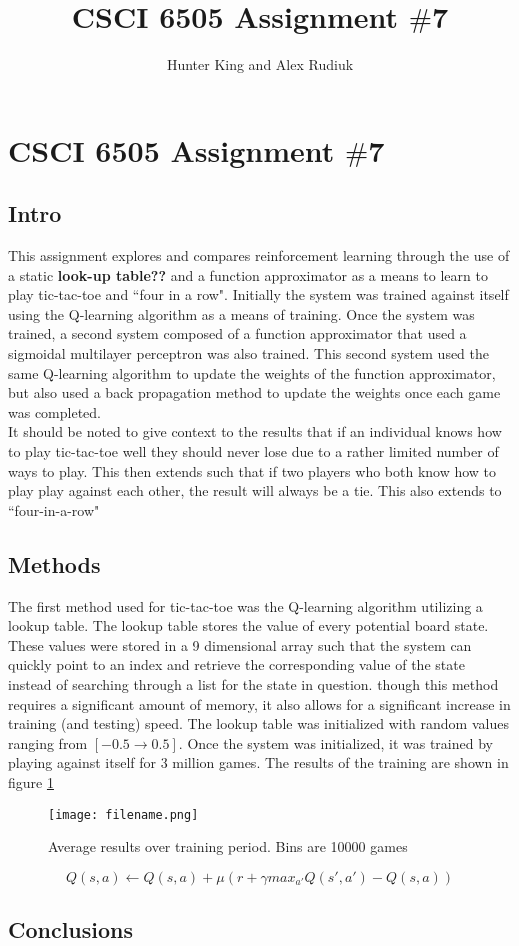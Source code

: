 \documentclass[12pt,a4paper]{article}
\author{Hunter King and Alex Rudiuk}
\title{CSCI 6505 Assignment $\#$7}
\begin{document}
\section*{CSCI 6505 Assignment $\#$7}
\subsection*{Intro}
This assignment explores and compares reinforcement learning through the use of a static \textbf{look-up table??} and a function approximator as a means to learn to play tic-tac-toe and ``four in a row". Initially the system was trained against itself using the Q-learning algorithm as a means of training. Once the system was trained, a second system composed of a function approximator that used a sigmoidal multilayer perceptron was also trained. This second system used the same Q-learning algorithm to update the weights of the function approximator, but also used a back propagation method to update the weights once each game was completed.\\
It should be noted to give context to the results that if an individual knows how to play tic-tac-toe well they should never lose due to a rather limited number of ways to play. This then extends such that if two players who both know how to play play against each other, the result will always be a tie. This also extends to ``four-in-a-row"
\subsection*{Methods}
The first method used for tic-tac-toe was the Q-learning algorithm utilizing a lookup table. The lookup table stores the value of every potential board state. These values were stored in a 9 dimensional array such that the system can quickly point to an index and retrieve the corresponding value of the state instead of searching through a list for the state in question. though this method requires a significant amount of memory, it also allows for a significant increase in training (and testing) speed. The lookup table was initialized with random values ranging from $[-0.5 \rightarrow 0.5]$. Once the system was initialized, it was trained by playing against itself for 3 million games. The results of the training are shown in figure \ref{fig:training}
\begin{figure}[h]
\centering
\texttt{[image: filename.png]}
\caption{Average results over training period. Bins are 10000 games}
\label{fig:training}
\end{figure}
\begin{equation}
{Q(s,a)} \leftarrow {Q(s,a) + \mu(r + \gamma max_{a'}Q(s',a')-Q(s,a))}
\end{equation}
\subsection*{Conclusions}
\end{document}
